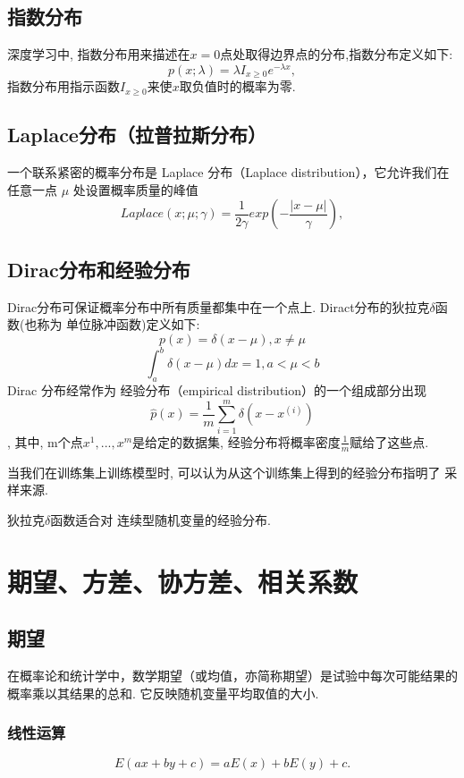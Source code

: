 \subsection{ 指数分布}
\label{ux6307ux6570ux5206ux5e03}
深度学习中, 指数分布用来描述在\(x=0​\)点处取得边界点的分布,指数分布定义如下:
\[
p(x;\lambda)=\lambda I_{x\geq 0}e^{-\lambda{x}},
\]
指数分布用指示函数\(I_{x\geq 0}​\)来使\(x​\)取负值时的概率为零.

\subsection{ Laplace分布（拉普拉斯分布）}
\label{laplace-ux5206ux5e03ux62c9ux666eux62c9ux65afux5206ux5e03}
一个联系紧密的概率分布是 Laplace 分布（Laplace distribution），它允许我们在任意一点 \(\mu\) 处设置概率质量的峰值
\[
Laplace(x;\mu;\gamma)=\frac{1}{2\gamma}exp\left(-\frac{|x-\mu|}{\gamma}\right),
\]

\subsection{Dirac分布和经验分布}
\label{diracux5206ux5e03ux548cux7ecfux9a8cux5206ux5e03}

Dirac分布可保证概率分布中所有质量都集中在一个点上.
Diract分布的狄拉克\(\delta​\)函数(也称为 {单位脉冲函数})定义如下:
\[
p(x)=\delta(x-\mu), x\neq \mu
\]
\[
\int_{a}^{b}\delta(x-\mu)dx = 1, a < \mu < b
\]
Dirac 分布经常作为 经验分布（empirical distribution）的一个组成部分出现
\[
\hat{p}( {x})=\frac{1}{m}\sum_{i=1}^{m}\delta( {x}-{ {x}}^{(i)})
\] , 其中, m个点\(x^{1},...,x^{m}\)是给定的数据集,
 {经验分布}将概率密度\(\frac{1}{m}​\)赋给了这些点.

当我们在训练集上训练模型时,
可以认为从这个训练集上得到的经验分布指明了 {采样来源}.

狄拉克$δ$函数适合对 {连续型}随机变量的经验分布.

\section{期望、方差、协方差、相关系数}
\label{ux671fux671bux65b9ux5deeux534fux65b9ux5deeux76f8ux5173ux7cfbux6570}
\subsection{ 期望}
\label{ux671fux671b}
在概率论和统计学中，数学期望（或均值，亦简称期望）是试验中每次可能结果的概率乘以其结果的总和.
它反映随机变量平均取值的大小.

\subsubsection{线性运算}
\label{sec:6.1.1}
\begin{equation}
  \label{eq:0601}
 E(ax+by+c) = aE(x)+bE(y)+c.
\end{equation}
